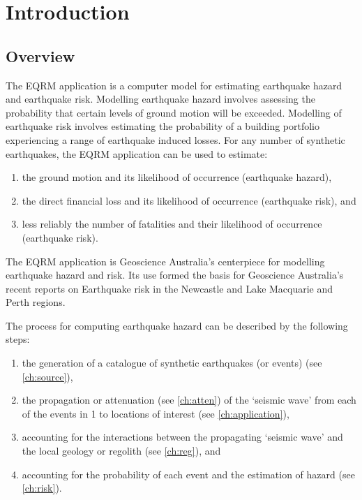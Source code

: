 \chapter{Introduction}
\label{ch:intro}

\section{Overview}

The EQRM application is a computer model for estimating earthquake
hazard and earthquake risk. Modelling earthquake hazard involves
assessing the probability that certain levels of ground motion
will be exceeded. Modelling of earthquake risk involves estimating
the probability of a building portfolio experiencing a range of
earthquake induced losses. For any number of synthetic
earthquakes, the EQRM application can be used to estimate:
\begin{enumerate}
\item the ground motion and its likelihood of occurrence
(earthquake hazard), \item the direct financial loss and its
likelihood of occurrence (earthquake risk), and \item less
reliably the number of fatalities and their
likelihood of occurrence (earthquake risk).
\end{enumerate}

The EQRM application is Geoscience Australia's centerpiece for
modelling earthquake hazard and risk. Its use formed the basis for
Geoscience Australia's recent reports on Earthquake risk in the
Newcastle and Lake Macquarie \citep*{dr_Dhu02a} and Perth
\citep*{dr_Sinadinovski05a} regions.

The process for computing earthquake hazard can be described by
the following steps:
\begin{enumerate}
\item the generation of a catalogue of synthetic earthquakes (or
events) (see \cref{ch:source}), 
\item the propagation or
attenuation (see \cref{ch:atten}) of the `seismic wave' from each
of the events in 1 to locations of interest (see \cref{ch:application}),
\item accounting for the interactions between the propagating
`seismic wave' and the local geology or regolith (see
\cref{ch:reg}), and \item accounting for the probability of each
event and the estimation of hazard (see \cref{ch:risk}).
\end{enumerate}

